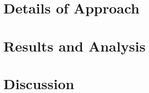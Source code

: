 \documentclass[12pt]{article}
\begin{document}

\section{Details of Approach}



\section{Results and Analysis}





\section{Discussion}
\end{document}
